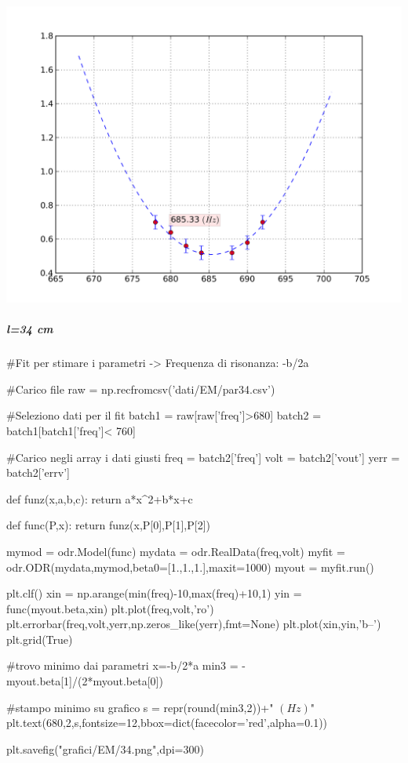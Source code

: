 \includegraphics[scale=0.75]{grafici/EM/38.png}

\subparagraph*{l=34 cm}

\begin{sagesilent}
 #Fit per stimare i parametri -> Frequenza di risonanza: -b/2a

#Carico file
raw = np.recfromcsv('dati/EM/par34.csv')

#Seleziono dati per il fit
batch1 = raw[raw['freq']>680]
batch2 = batch1[batch1['freq']< 760]

#Carico negli array i dati giusti
freq = batch2['freq']
volt = batch2['vout']
yerr = batch2['errv']


def funz(x,a,b,c):
    return a*x^2+b*x+c

def func(P,x):
    return funz(x,P[0],P[1],P[2])

mymod = odr.Model(func)
mydata = odr.RealData(freq,volt)
myfit = odr.ODR(mydata,mymod,beta0=[1.,1.,1.],maxit=1000)
myout = myfit.run()

plt.clf()
xin = np.arange(min(freq)-10,max(freq)+10,1)
yin = func(myout.beta,xin)
plt.plot(freq,volt,'ro')
plt.errorbar(freq,volt,yerr,np.zeros_like(yerr),fmt=None)
plt.plot(xin,yin,'b--')
plt.grid(True)

#trovo minimo dai parametri x=-b/2*a
min3 = -myout.beta[1]/(2*myout.beta[0])


#stampo minimo su grafico
s = repr(round(min3,2))+" $(Hz)$"
plt.text(680,2,s,fontsize=12,bbox=dict(facecolor='red',alpha=0.1))

plt.savefig("grafici/EM/34.png",dpi=300)
\end{sagesilent}

